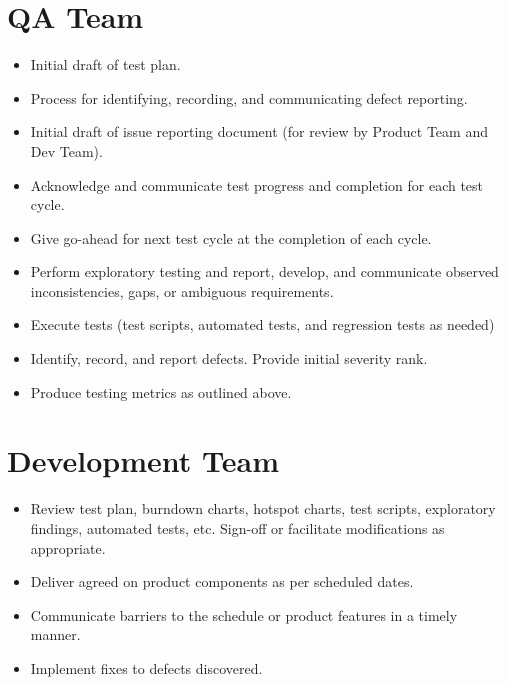 \documentclass[letterpaper,10pt,english]{sphinxmanual}
\begin{document}
\section{QA Team}
\label{\detokenize{test_plan/roles_and_responsibilities:qa-team}}
\begin{itemize}
\item {} 
Initial draft of test plan.

\item {} 
Process for identifying, recording, and communicating defect reporting.

\item {} 
Initial draft of issue reporting document (for review by Product Team and Dev Team).

\item {} 
Acknowledge and communicate test progress and completion for each test cycle.

\item {} 
Give go-ahead for next test cycle at the completion of each cycle.

\item {} 
Perform exploratory testing and report, develop, and communicate observed inconsistencies, gaps, or ambiguous requirements.

\item {} 
Execute tests (test scripts, automated tests, and regression tests as needed)

\item {} 
Identify, record, and report defects. Provide initial severity rank.

\item {} 
Produce testing metrics as outlined above.

\end{itemize}


\section{Development Team}
\label{\detokenize{test_plan/roles_and_responsibilities:development-team}}
\begin{itemize}
\item {} 
Review test plan, burndown charts, hotspot charts, test scripts, exploratory findings, automated tests, etc.  Sign-off or facilitate modifications as appropriate.

\item {} 
Deliver agreed on product components as per scheduled dates.

\item {} 
Communicate barriers to the schedule or product features in a timely manner.

\item {} 
Implement fixes to defects discovered.

\end{itemize}
\end{document}
